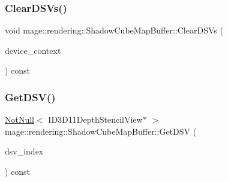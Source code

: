 \hypertarget{classmage_1_1rendering_1_1_shadow_cube_map_buffer_a31df46f6fe89cbaedb7f256ab7ecf514}{}\label{classmage_1_1rendering_1_1_shadow_cube_map_buffer_a31df46f6fe89cbaedb7f256ab7ecf514} 
\subsubsection{\texorpdfstring{Clear\+D\+S\+Vs()}{ClearDSVs()}}
{\footnotesize\ttfamily void mage\+::rendering\+::\+Shadow\+Cube\+Map\+Buffer\+::\+Clear\+D\+S\+Vs (\begin{DoxyParamCaption}\item[{I\+D3\+D11\+Device\+Context \&}]{device\+\_\+context }\end{DoxyParamCaption}) const\hspace{0.3cm}{\ttfamily [noexcept]}}

\hypertarget{classmage_1_1rendering_1_1_shadow_cube_map_buffer_a244e06f9f499496fe721af7f1bd2ea5f}{}\label{classmage_1_1rendering_1_1_shadow_cube_map_buffer_a244e06f9f499496fe721af7f1bd2ea5f} 
\subsubsection{\texorpdfstring{Get\+D\+S\+V()}{GetDSV()}}
{\footnotesize\ttfamily \hyperlink{namespacemage_a8769f9d670d6b585ea306cb1062af94b}{Not\+Null}$<$ I\+D3\+D11\+Depth\+Stencil\+View$\ast$ $>$ mage\+::rendering\+::\+Shadow\+Cube\+Map\+Buffer\+::\+Get\+D\+SV (\begin{DoxyParamCaption}\item[{size\+\_\+t}]{dsv\+\_\+index }\end{DoxyParamCaption}) const\hspace{0.3cm}{\ttfamily [noexcept]}}

\hypertarget{classmage_1_1rendering_1_1_shadow_cube_map_buffer_a6641e56d3f586ab2cdc74d26b8877168}{}\label{classmage_1_1rendering_1_1_shadow_cube_map_buffer_a6641e56d3f586ab2cdc74d26b8877168} 
